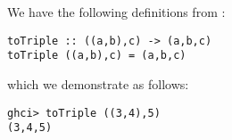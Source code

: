 
We have the following definitions from :
\begin{verbatim}
toTriple :: ((a,b),c) -> (a,b,c)
toTriple ((a,b),c) = (a,b,c)
\end{verbatim}
which we demonstrate as follows:
\begin{verbatim}
ghci> toTriple ((3,4),5)
(3,4,5)
\end{verbatim}

